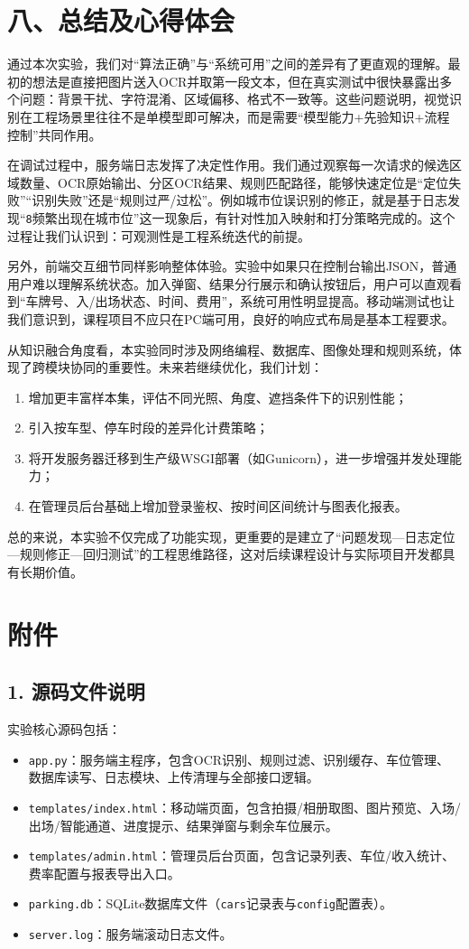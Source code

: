 \documentclass[12pt,a4paper]{article}
\begin{document}
\section*{八、总结及心得体会}
通过本次实验，我们对“算法正确”与“系统可用”之间的差异有了更直观的理解。最初的想法是直接把图片送入OCR并取第一段文本，但在真实测试中很快暴露出多个问题：背景干扰、字符混淆、区域偏移、格式不一致等。这些问题说明，视觉识别在工程场景里往往不是单模型即可解决，而是需要“模型能力+先验知识+流程控制”共同作用。

在调试过程中，服务端日志发挥了决定性作用。我们通过观察每一次请求的候选区域数量、OCR原始输出、分区OCR结果、规则匹配路径，能够快速定位是“定位失败”“识别失败”还是“规则过严/过松”。例如城市位误识别的修正，就是基于日志发现“\texttt{8}频繁出现在城市位”这一现象后，有针对性加入映射和打分策略完成的。这个过程让我们认识到：可观测性是工程系统迭代的前提。

另外，前端交互细节同样影响整体体验。实验中如果只在控制台输出JSON，普通用户难以理解系统状态。加入弹窗、结果分行展示和确认按钮后，用户可以直观看到“车牌号、入/出场状态、时间、费用”，系统可用性明显提高。移动端测试也让我们意识到，课程项目不应只在PC端可用，良好的响应式布局是基本工程要求。

从知识融合角度看，本实验同时涉及网络编程、数据库、图像处理和规则系统，体现了跨模块协同的重要性。未来若继续优化，我们计划：
\begin{enumerate}
  \item 增加更丰富样本集，评估不同光照、角度、遮挡条件下的识别性能；
  \item 引入按车型、停车时段的差异化计费策略；
  \item 将开发服务器迁移到生产级WSGI部署（如Gunicorn），进一步增强并发处理能力；
  \item 在管理员后台基础上增加登录鉴权、按时间区间统计与图表化报表。
\end{enumerate}

总的来说，本实验不仅完成了功能实现，更重要的是建立了“问题发现—日志定位—规则修正—回归测试”的工程思维路径，这对后续课程设计与实际项目开发都具有长期价值。

\section*{附件}
\subsection*{1. 源码文件说明}
实验核心源码包括：
\begin{itemize}
  \item \texttt{app.py}：服务端主程序，包含OCR识别、规则过滤、识别缓存、车位管理、数据库读写、日志模块、上传清理与全部接口逻辑。
  \item \texttt{templates/index.html}：移动端页面，包含拍摄/相册取图、图片预览、入场/出场/智能通道、进度提示、结果弹窗与剩余车位展示。
  \item \texttt{templates/admin.html}：管理员后台页面，包含记录列表、车位/收入统计、费率配置与报表导出入口。
  \item \texttt{parking.db}：SQLite数据库文件（\texttt{cars}记录表与\texttt{config}配置表）。
  \item \texttt{server.log}：服务端滚动日志文件。
\end{itemize}
\end{document}
